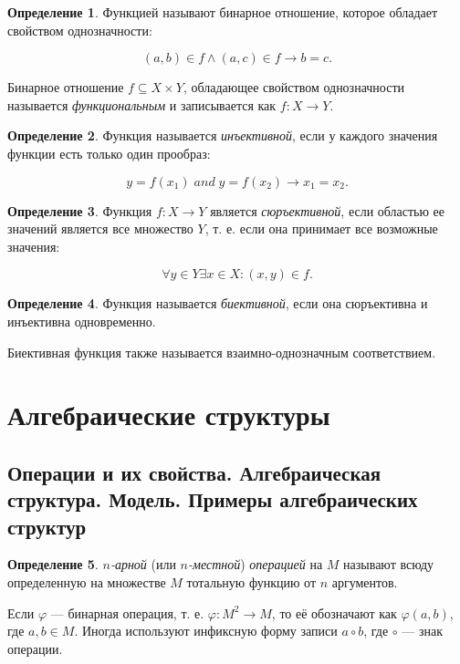 \documentclass{article}
\theoremstyle{plain}
\theoremstyle{definition}
\newtheorem{definition}{Определение}[subsection]
\begin{document}
\begin{definition}
	Функцией называют бинарное отношение, которое обладает свойством однозначности:

	\[
		(a, b) \in f \land (a, c) \in f \rightarrow b = c.
	\]
\end{definition}

Бинарное отношение \(f \subseteq X \times Y\), обладающее свойством однозначности называется \textit{функциональным} и записывается как \(f \colon X \rightarrow Y\).

\begin{definition}
	Функция называется \textit{инъективной}, если у каждого значения функции есть только один прообраз:

	\[
		y = f(x_1) \;and\; y = f(x_2) \rightarrow x_1 = x_2.
	\]
\end{definition}

\begin{definition}
	Функция \(f: X \rightarrow Y\) является \textit{сюръективной}, если областью ее значений является все множество \(Y\), т. е. если она принимает все возможные значения:

	\[
		\forall y \in Y \exists x \in X \colon (x, y) \in f.
	\]
\end{definition}

\begin{definition}
	Функция называется \textit{биективной}, если она сюръективна и инъективна одновременно.
\end{definition}

Биективная функция также называется взаимно-однозначным соответствием.

\section{Алгебраические структуры}

\subsection{Операции и их свойства. Алгебраическая структура. Модель. Примеры алгебраических структур}

\begin{definition}
	\textit{\(n\)-арной} (или \textit{\(n\)-местной}) \textit{операцией} на \(M\) называют всюду определенную на множестве \(M\) тотальную функцию от \(n\) аргументов.
\end{definition}

Если \(\varphi\) --- бинарная операция, т. е. \(\varphi \colon M^2 \rightarrow M\), то её обозначают как \(\varphi(a, b)\), где \(a, b \in M\). Иногда используют инфиксную форму записи \(a \circ b\), где \(\circ\) --- знак операции.
\end{document}
